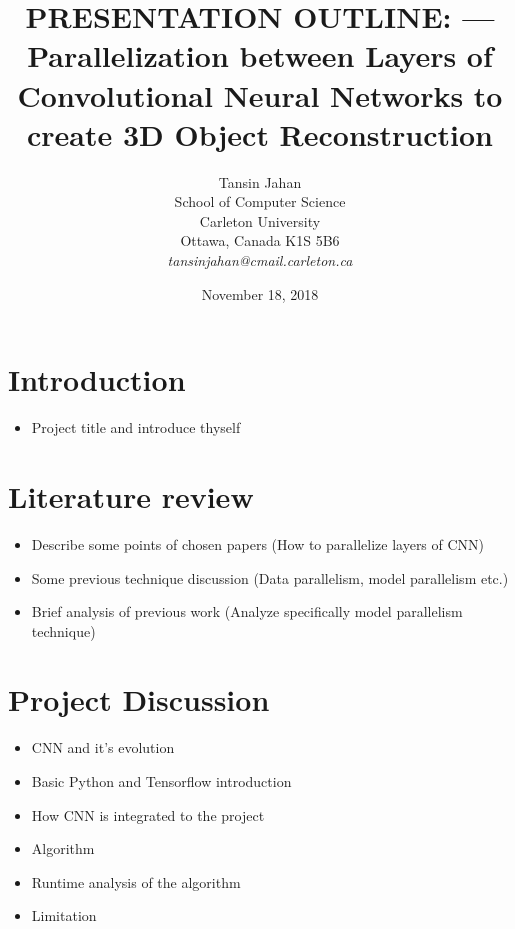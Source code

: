 \documentclass[11pt]{article}       %
\newenvironment{slide}[1]        {\section{#1} \begin{itemize}}%
                                 {\end{itemize}}
\begin{document}


\title{PRESENTATION OUTLINE: --- Parallelization between Layers of Convolutional Neural Networks to create 3D Object Reconstruction}


\author{
Tansin Jahan\\
School of Computer Science\\
Carleton University\\
Ottawa, Canada K1S 5B6\\
{\em tansinjahan@cmail.carleton.ca}
} %
\date{November 18, 2018}
\maketitle

\begin{slide}{Introduction}
\item Project title and introduce thyself
\end{slide}

\begin{slide}{Literature review}
\item Describe some points of chosen papers (How to parallelize layers of CNN) 
\item Some previous technique discussion (Data parallelism, model parallelism etc.)
\item Brief analysis of previous work (Analyze specifically model parallelism technique)
\end{slide}

\begin{slide}{Project Discussion}
\item CNN and it's evolution
\item Basic Python and Tensorflow introduction
\item How CNN is integrated to the project
\item Algorithm
\item Runtime analysis of the algorithm
\item Limitation
\end{slide}
\end{document}
